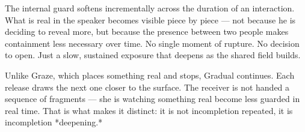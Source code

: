 The internal guard softens incrementally across the duration of an interaction. What is real in the speaker becomes 
visible piece by piece — not because he is deciding to reveal more, but because the presence between two people makes 
containment less necessary over time. No single moment of rupture. No decision to open. Just a slow, sustained exposure 
that deepens as the shared field builds.

Unlike Graze, which places something real and stops, Gradual continues. Each release draws the next one closer to the surface. 
The receiver is not handed a sequence of fragments — she is watching something real become less guarded in real time. 
That is what makes it distinct: it is not incompletion repeated, it is incompletion *deepening.*